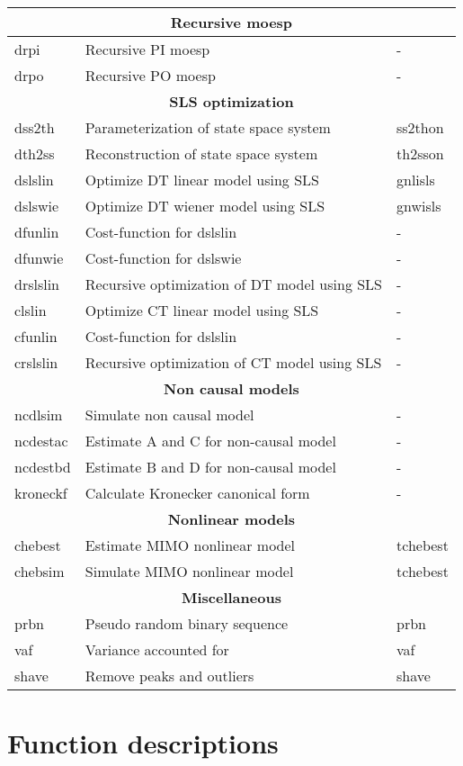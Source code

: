\documentclass{book}
\begin{document}
\begin{tabular}{|l|l|l|}
 \multicolumn{3}{|c|}{\textbf{Recursive moesp}}\\\hline
 drpi&Recursive PI moesp&-\\\hline
 drpo&Recursive PO moesp&-\\\hline
 \multicolumn{3}{|c|}{\textbf{SLS optimization}}\\\hline
 dss2th&Parameterization of state space system &ss2thon\\\hline
 dth2ss&Reconstruction of state space system & th2sson\\\hline
 dslslin&Optimize DT linear model using SLS&gnlisls\\\hline 
 dslswie&Optimize DT wiener model using SLS&gnwisls\\\hline 
 dfunlin&Cost-function for dslslin&-\\\hline 
 dfunwie&Cost-function for dslswie&-\\\hline 
 drslslin&Recursive optimization of DT model using SLS&-\\\hline 
 clslin&Optimize CT linear model using SLS&-\\\hline 
 cfunlin&Cost-function for dslslin&-\\\hline 
 crslslin&Recursive optimization of CT model using SLS&-\\\hline 
 \multicolumn{3}{|c|}{\textbf{Non causal models}}\\\hline
 ncdlsim &Simulate non causal model&-\\\hline
 ncdestac&Estimate A and C for non-causal model&-\\\hline
 ncdestbd&Estimate B and D for non-causal model&-\\\hline
 kroneckf&Calculate Kronecker canonical form&-\\\hline
 \multicolumn{3}{|c|}{\textbf{Nonlinear models}}\\\hline
 chebest&Estimate MIMO nonlinear model &tchebest \\\hline
 chebsim&Simulate MIMO nonlinear model &tchebest \\\hline
\multicolumn{3}{|c|}{\textbf{Miscellaneous}}\\\hline
prbn&Pseudo random binary sequence &prbn\\\hline
vaf&Variance accounted for&vaf\\\hline
shave& Remove peaks and outliers&shave\\\hline
\end{tabular}

\section{Function descriptions}
\end{document}
